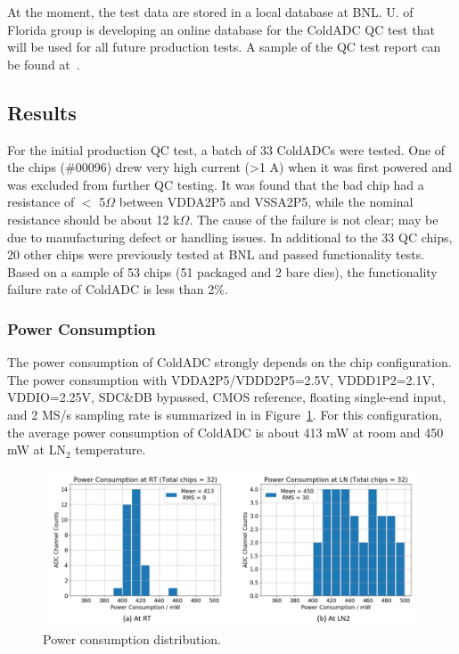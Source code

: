 At the moment, the test data are stored in a local database at BNL. U. of Florida group is developing an online database for the ColdADC QC test that will be used for all future production tests. A sample of the QC test report can be found at~\cite{qcreport}.

\subsection{Results}
\label{sec:6.2}
For the initial production QC test, a batch of 33 ColdADCs were tested. One of the chips (\#00096)  drew very high current (>1 A) when it 
was first powered and was excluded from further QC testing. It was found that the bad chip had a resistance of $<$ 5$\Omega$ between 
VDDA2P5 and VSSA2P5, while the nominal resistance should be about 12 k$\Omega$. The cause of the failure is not clear; may be due to 
manufacturing defect or handling issues. In additional to the 33 QC chips, 20 other chips were previously tested at BNL and passed 
functionality tests. Based on a sample of 53 chips (51 packaged and 2 bare dies), the functionality failure rate of ColdADC is less than 2\%.

\subsubsection{Power Consumption}
The power consumption of ColdADC strongly depends on the chip configuration. The power consumption with VDDA2P5/VDDD2P5=2.5V, 
VDDD1P2=2.1V, VDDIO=2.25V, SDC\&DB bypassed, CMOS reference, floating single-end input, and 2 MS/s sampling rate is summarized in in 
Figure~\ref{fig:qc_power}. For this configuration, the average power consumption of ColdADC is about 413 mW at room and 450 mW at LN$_2$ temperature.
\begin{figure}[h!]
\centering
  \includegraphics[width=0.85\linewidth]{figures/qc_power.png}
  \caption{Power consumption distribution.}
  \label{fig:qc_power}
\end{figure}


